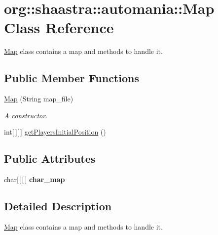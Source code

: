 \hypertarget{classorg_1_1shaastra_1_1automania_1_1Map}{
\section{\-o\-r\-g\-:\-:\-s\-h\-a\-a\-s\-t\-r\-a\-:\-:\-a\-u\-t\-o\-m\-a\-n\-i\-a\-:\-:\-M\-a\-p \-C\-l\-a\-s\-s \-R\-e\-f\-e\-r\-e\-n\-c\-e}
\label{classorg_1_1shaastra_1_1automania_1_1Map}
}


\hyperlink{classorg_1_1shaastra_1_1automania_1_1Map}{Map} class contains a map and methods to handle it.  


\subsection*{Public Member Functions}
\begin{DoxyCompactItemize}
\item 
\hyperlink{classorg_1_1shaastra_1_1automania_1_1Map_a0565ba7de02cbc499c5ba3b90fc5707e}{\-M\-a\-p} \-(\-S\-t\-r\-i\-n\-g \-m\-a\-p\_\-\-f\-i\-l\-e\-)
\begin{DoxyCompactList}\small\item\em A constructor. \end{DoxyCompactList}\item 
\-i\-n\-t\mbox{[}$\,$\mbox{]}\mbox{[}$\,$\mbox{]} \hyperlink{classorg_1_1shaastra_1_1automania_1_1Map_a5e6c38bfbfc4b755f86c2eb048473aa4}{\-g\-e\-t\-P\-l\-a\-y\-e\-r\-s\-I\-n\-i\-t\-i\-a\-l\-P\-o\-s\-i\-t\-i\-o\-n} \-(\-)
\end{DoxyCompactItemize}
\subsection*{Public Attributes}
\begin{DoxyCompactItemize}
\item 
\hypertarget{classorg_1_1shaastra_1_1automania_1_1Map_a1b79cad7dfaa71a83b7bfd859980eed2}{
\-c\-h\-a\-r\mbox{[}$\,$\mbox{]}\mbox{[}$\,$\mbox{]} {\bfseries \-c\-h\-a\-r\_\-\-m\-a\-p}}
\label{classorg_1_1shaastra_1_1automania_1_1Map_a1b79cad7dfaa71a83b7bfd859980eed2}

\end{DoxyCompactItemize}


\subsection{Detailed Description}
\hyperlink{classorg_1_1shaastra_1_1automania_1_1Map}{Map} class contains a map and methods to handle it. 

